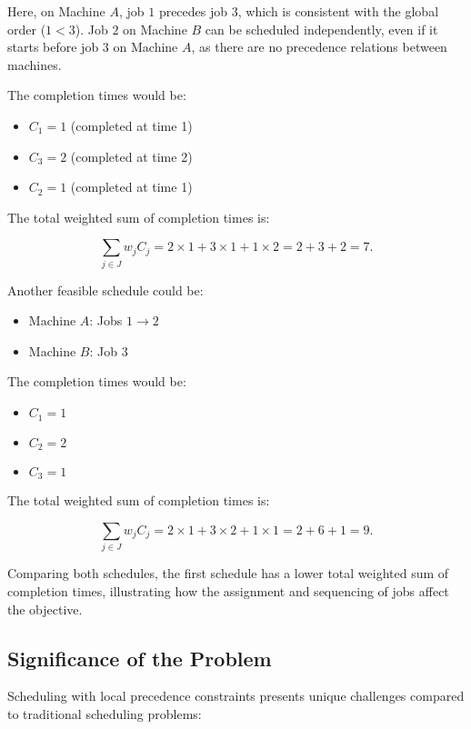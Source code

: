 Here, on Machine $A$, job $1$ precedes job $3$, which is consistent with the global order ($1 < 3$). Job $2$ on Machine $B$ can be scheduled independently, even if it starts before job $3$ on Machine $A$, as there are no precedence relations between machines.

The completion times would be:

\begin{itemize}
    \item $C_1 = 1$ (completed at time 1)
    \item $C_3 = 2$ (completed at time 2)
    \item $C_2 = 1$ (completed at time 1)
\end{itemize}

The total weighted sum of completion times is:

\[
    \sum_{j \in J} w_j C_j = 2 \times 1 + 3 \times 1 + 1 \times 2 = 2 + 3 + 2 = 7.
\]

Another feasible schedule could be:

\begin{itemize}
    \item Machine $A$: Jobs $1 \rightarrow 2$
    \item Machine $B$: Job $3$
\end{itemize}

The completion times would be:

\begin{itemize}
    \item $C_1 = 1$
    \item $C_2 = 2$
    \item $C_3 = 1$
\end{itemize}

The total weighted sum of completion times is:

\[
    \sum_{j \in J} w_j C_j = 2 \times 1 + 3 \times 2 + 1 \times 1 = 2 + 6 + 1 = 9.
\]

Comparing both schedules, the first schedule has a lower total weighted sum of completion times, illustrating how the assignment and sequencing of jobs affect the objective.

\subsection{Significance of the Problem}

Scheduling with local precedence constraints presents unique challenges compared to traditional scheduling problems:

